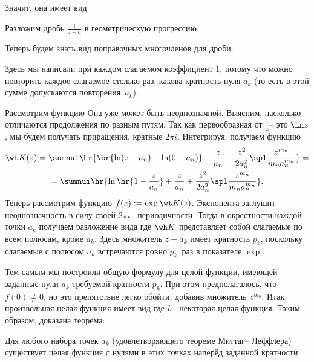 \documentclass[a4paper]{article}
\begin{document}
Значит, она имеет вид

Разложим дробь $\frac{1}{z-a}$
в геометрическую прогрессию:

Теперь будем знать вид поправочных многочленов для дроби:


Здесь мы написали при каждом слагаемом коэффициент $1$, потому что можно повторить каждое слагаемое
столько раз, какова кратность нуля $a_k$ (то есть в этой сумме допускаются повторения~$a_k$).

Рассмотрим функцию
Она уже может быть неоднозначной. Выясним, насколько отличаются продолжения по разным путям.
Так как первообразная от $\frac1z$-- это $\Ln z$, мы будем получать приращения, кратные $2\pi i$.
Интегрируя, получаем функцию
\begin{multline}\wt K(z) = \sumnui\hr{\br{\ln(z-a_n) - \ln(0-a_n)} +
\frac{z}{a_n} + \frac{z^2}{2a_n^2}\spl \frac{z^{m_n}}{m_n a_n^{m_n}}} =\\=
\sumnui\hr{\ln\hr{1-\frac{z}{a_n}} + \frac{z}{a_n} + \frac{z^2}{2a_n^2}\spl \frac{z^{m_n}}{m_n a_n^{m_n}}}.
\end{multline}
Теперь рассмотрим функцию $f(z) := \exp\wt K(z)$. Экспонента заглушит неоднозначность в силу
своей $2\pi i$-- периодичности. Тогда в окрестности каждой точки $a_k$ получаем разложение вида
где $\wh K$ представляет собой слагаемые по всем полюсам, кроме $a_k$. Здесь множитель
$z-a_k$ имеет кратность $p_k$, поскольку слагаемые с полюсом $a_k$ встречаются ровно
$p_k$~раз в показателе $\exp$.

Тем самым мы построили общую формулу для целой функции, имеющей заданные нули $a_k$
требуемой кратности $p_k$. При этом предполагалось, что $f(0) \neq 0$, но это препятствие
легко обойти, добавив множитель $z^{m_0}$. Итак, произвольная целая функция имеет вид
где $h$-- некоторая целая функция. Таким образом, доказана теорема:
\begin{theorem}[Вейерштрасса]
Для любого набора точек $a_k$ (удовлетворяющего теореме Миттаг-- Леффлера) существует
целая функция с нулями в этих точках наперёд заданной кратности.
\end{theorem}
\end{document}
